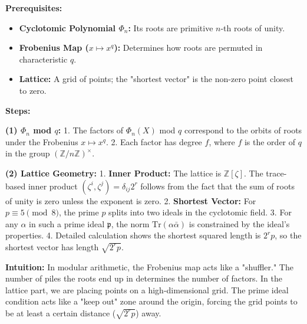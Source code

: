 \begin{solution}
\textbf{Prerequisites:}
\begin{itemize}
    \item \textbf{Cyclotomic Polynomial $\Phi_n$:} Its roots are primitive $n$-th roots of unity.
    \item \textbf{Frobenius Map ($x \mapsto x^q$):} Determines how roots are permuted in characteristic $q$.
    \item \textbf{Lattice:} A grid of points; the "shortest vector" is the non-zero point closest to zero.
\end{itemize}

\textbf{Steps:}

\textbf{(1) $\Phi_n$ mod $q$:}
1. The factors of $\Phi_n(X)$ mod $q$ correspond to the orbits of roots under the Frobenius $x \mapsto x^q$.
2. Each factor has degree $f$, where $f$ is the order of $q$ in the group $(\mathbb{Z}/n\mathbb{Z})^\times$.

\textbf{(2) Lattice Geometry:}
1. \textbf{Inner Product:} The lattice is $\mathbb{Z}[\zeta]$. The trace-based inner product $(\zeta^i, \zeta^j) = \delta_{ij} 2^r$ follows from the fact that the sum of roots of unity is zero unless the exponent is zero.
2. \textbf{Shortest Vector:} For $p \equiv 5 \pmod 8$, the prime $p$ splits into two ideals in the cyclotomic field.
3. For any $\alpha$ in such a prime ideal $\mathfrak{p}$, the norm $\text{Tr}(\alpha \bar{\alpha})$ is constrained by the ideal's properties.
4. Detailed calculation shows the shortest squared length is $2^r p$, so the shortest vector has length $\sqrt{2^r p}$.

\textbf{Intuition:}
In modular arithmetic, the Frobenius map acts like a "shuffler." The number of piles the roots end up in determines the number of factors. In the lattice part, we are placing points on a high-dimensional grid. The prime ideal condition acts like a "keep out" zone around the origin, forcing the grid points to be at least a certain distance ($\sqrt{2^r p}$) away.
\end{solution}
